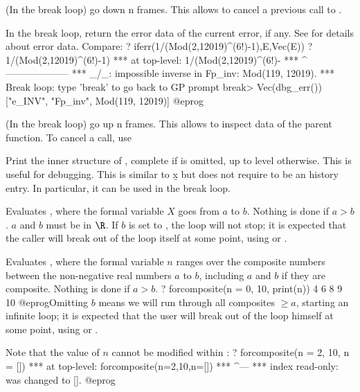 \label{se:dbg_down}
(In the break loop) go down n frames. This allows to cancel a previous call to
.

\label{se:dbg_err}
In the break loop, return the error data of the current error, if any.
See  for details about error data.  Compare:
\bprog
? iferr(1/(Mod(2,12019)^(6!)-1),E,Vec(E))
? 1/(Mod(2,12019)^(6!)-1)
  ***   at top-level: 1/(Mod(2,12019)^(6!)-
  ***                  ^--------------------
  *** _/_: impossible inverse in Fp_inv: Mod(119, 12019).
  ***   Break loop: type 'break' to go back to GP prompt
break> Vec(dbg_err())
["e_INV", "Fp_inv", Mod(119, 12019)]
@eprog

\label{se:dbg_up}
(In the break loop) go up n frames. This allows to inspect data of the
parent function. To cancel a  call, use 

\label{se:dbg_x}
Print the inner structure of , complete if  is omitted, up
to level  otherwise. This is useful for debugging. This is similar to
\b{x} but does not require  to be an history entry. In particular,
it can be used in the break loop.

\label{se:for}
Evaluates , where
the formal variable $X$ goes from $a$ to $b$. Nothing is done if $a>b$.
$a$ and $b$ must be in $\R$. If $b$ is set to , the loop will not
stop; it is expected that the caller will break out of the loop itself at some
point, using  or .

\label{se:forcomposite}
Evaluates ,
where the formal variable $n$ ranges over the composite numbers between the
non-negative real numbers $a$ to $b$, including $a$ and $b$ if they are
composite. Nothing is done if $a>b$.
\bprog
? forcomposite(n = 0, 10, print(n))
4
6
8
9
10
@eprog\noindent Omitting $b$ means we will run through all composites $\geq a$,
starting an infinite loop; it is expected that the user will break out of
the loop himself at some point, using  or .

Note that the value of $n$ cannot be modified within :
\bprog
? forcomposite(n = 2, 10, n = [])
 ***   at top-level: forcomposite(n=2,10,n=[])
 ***                                      ^---
 ***   index read-only: was changed to [].
@eprog

